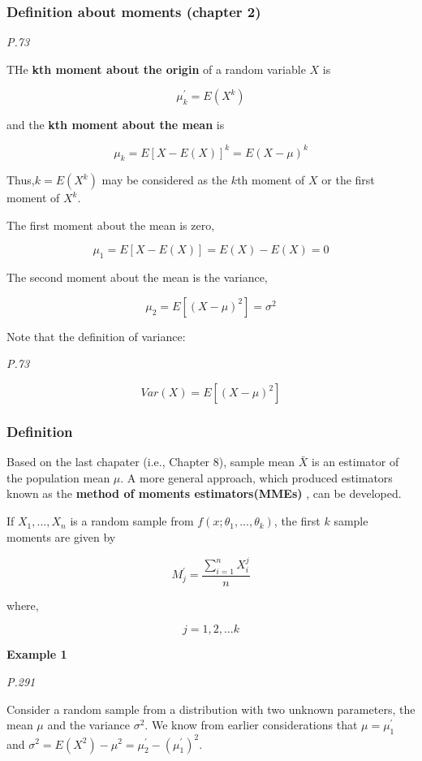 \documentclass[
]{book}
\begin{document}
\hypertarget{definition-about-moments-chapter-2}{%
\subsubsection{Definition about moments (chapter 2)}\label{definition-about-moments-chapter-2}}

\emph{P.73}

THe \textbf{kth moment about the origin} of a random variable \(X\) is

\[\mu^{'}_k=E(X^k)\]

and the \textbf{kth moment about the mean} is

\[\mu_k=E[X-E(X)]^k=E(X-\mu)^k\]

Thus,\(k=E(X^k)\) may be considered as the \(k\)th moment of \(X\) or the first moment of \(X^k\).

The first moment about the mean is zero,

\[\mu_1=E[X-E(X)]=E(X)-E(X)=0\]

The second moment about the mean is the variance,

\[\mu_2=E[(X-\mu)^2]=\sigma^2\]

Note that the definition of variance:

\emph{P.73}

\[Var(X)=E[(X-\mu)^2]\]

\hypertarget{definition}{%
\subsubsection{Definition}\label{definition}}

Based on the last chapater (i.e., Chapter 8), sample mean \(\bar{X}\) is an estimator of the population mean \(\mu\). A more general approach, which produced estimators known as the \textbf{method of moments estimators(MMEs)} , can be developed.

If \(X_1,...,X_n\) is a random sample from \(f(x; \theta_1,...,\theta_k)\), the first \(k\) sample moments are given by

\[M_j^{'}=\frac{\sum_{i=1}^n X_i^j}{n}\]

where,

\[j=1,2,...k\]

\textbf{Example 1}

\emph{P.291}

Consider a random sample from a distribution with two unknown parameters, the mean \(\mu\) and the variance \(\sigma^2\). We know from earlier considerations that \(\mu=\mu^{'}_1\) and \(\sigma^2=E(X^2)-\mu^2=\mu_2^{'}-(\mu^{'}_1)^2\).
\end{document}
